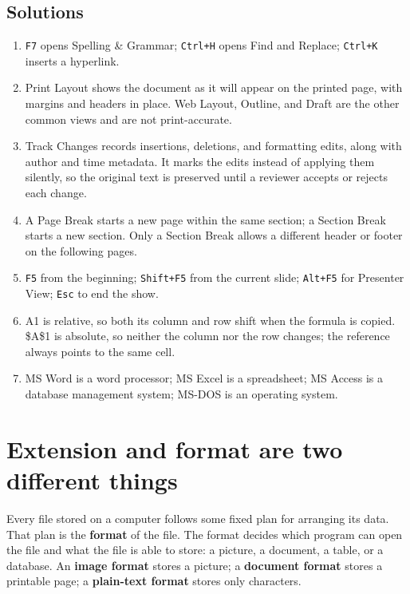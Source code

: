 \subsection*{Solutions}
\begingroup\small
\begin{enumerate}[label=\arabic*.]
  \item \texttt{F7} opens Spelling \& Grammar; \texttt{Ctrl+H} opens Find and
    Replace; \texttt{Ctrl+K} inserts a hyperlink.
  \item Print Layout shows the document as it will appear on the printed
    page, with margins and headers in place. Web Layout, Outline, and Draft
    are the other common views and are not print-accurate.
  \item Track Changes records insertions, deletions, and formatting edits,
    along with author and time metadata. It marks the edits instead of
    applying them silently, so the original text is preserved until a
    reviewer accepts or rejects each change.
  \item A Page Break starts a new page within the same section; a Section
    Break starts a new section. Only a Section Break allows a different
    header or footer on the following pages.
  \item \texttt{F5} from the beginning; \texttt{Shift+F5} from the current
    slide; \texttt{Alt+F5} for Presenter View; \texttt{Esc} to end the show.
  \item A1 is relative, so both its column and row shift when the formula is
    copied. \$A\$1 is absolute, so neither the column nor the row changes; the
    reference always points to the same cell.
  \item MS Word is a word processor; MS Excel is a spreadsheet; MS Access is
    a database management system; MS-DOS is an operating system.
\end{enumerate}
\endgroup

\section{Extension and format are two different things}
Every file stored on a computer follows some fixed plan for arranging its
data. That plan is the \textbf{format} of the file. The format decides which
program can open the file and what the file is able to store: a picture, a
document, a table, or a database. An \textbf{image format} stores a picture;
a \textbf{document format} stores a printable page; a \textbf{plain-text
format} stores only characters.

